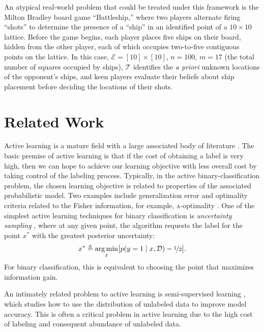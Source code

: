 \documentclass{acm_proc_article-sp}
\newcommand{\cm}[1]{\mathcal{#1}}
\newcommand{\data}{\cm{D}}
\newcommand{\given}{\mid}
\newcommand{\deq}{\triangleq}
\DeclareMathOperator*{\argmin}{arg\,min}
\begin{document}
An atypical real-world problem that could be treated under this
framework is the Milton Bradley board game ``Battleship,'' where two
players alternate firing ``shots'' to determine the presence of a
``ship'' in an identified point of a $10 \times 10$ lattice.  Before
the game begins, each player places five ships on their board, hidden
from the other player, each of which occupies two-to-five contiguous
points on the lattice.  In this case, $\cm{E} = [10] \times [10]$, $n
= 100$, $m = 17$ (the total number of squares occupied by ships),
$\cm{T}$ identifies the \emph{a priori} unknown locations of the
opponent's ships, and keen players evaluate their beliefs about ship
placement before deciding the locations of their shots.

\section{Related Work}
\label{related}

Active learning is a mature field with a large associated body of
literature \citep{activesurvey}.  The basic premise of active learning
is that if the cost of obtaining a label is very high, then we can
hope to achieve our learning objective with less overall cost by
taking control of the labeling process.  Typically, in the active
binary-classification problem, the chosen learning objective is
related to properties of the associated probabilistic model.  Two
examples include generalization error \citep{zhuactivesemi} and
optimality criteria related to the Fisher information, for example,
\textsc{a}-optimality \citep{activelogistic}.  One of the simplest
active learning techniques for binary classification is
\emph{uncertainty sampling} \citep{uncertaintysampling}, where at any
given point, the algorithm requests the label for the point $x^\ast$
with the greatest posterior uncertainty:
\begin{equation*}
  x^\ast 
  \deq 
  \argmin_x 
  \bigl\lvert 
  p(y = 1 \given x, \data) - \nicefrac{1}{2}
  \bigr\rvert.
\end{equation*}
For binary classification, this is equivalent to choosing the point
that maximizes information gain.

An intimately related problem to active learning is semi-supervised
learning \citep{semisurvey}, which studies how to use the distribution
of unlabeled data to improve model accuracy.  This is often a critical
problem in active learning due to the high cost of labeling and
consequent abundance of unlabeled data.
\end{document}
